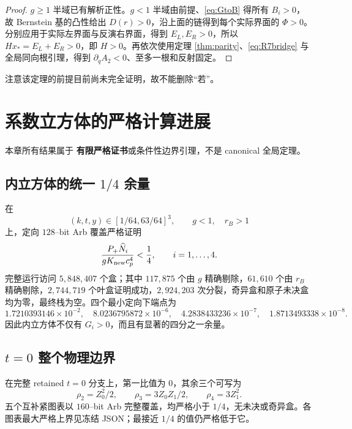 \documentclass[UTF8,12pt,openany,fontset=fandol]{ctexrep}
\theoremstyle{definition}
\newcommand{\Certified}{\textcolor{violet!70!black}{\textbf{有限严格证书}}}
\begin{document}
\begin{proof}
$g\ge1$ 半域已有解析正性。$g<1$ 半域由前提、\eqref{eq:GtoB} 得所有 $B_i>0$，故 Bernstein 基的凸性给出 $D(r)>0$，沿上面的链得到每个实际界面的 $\Phi>0$。分别应用于实际左界面与反演右界面，得到 $E_L,E_R>0$，所以 $Hx_*=E_L+E_R>0$，即 $H>0$。再依次使用定理 \ref{thm:parity}、\eqref{eq:R7bridge} 与全局同向根引理，得到 $\partial_qA_2<0$、至多一根和反射固定。
\end{proof}

注意该定理的前提目前尚未完全证明，故不能删除“若”。

\chapter{系数立方体的严格计算进展}

本章所有结果属于 \Certified 或条件性边界引理，不是 canonical 全局定理。

\section{内立方体的统一 $1/4$ 余量}

在
\begin{equation}
 (k,t,y)\in[1/64,63/64]^3,\qquad g<1,\quad r_B>1
\end{equation}
上，定向 $128$--bit Arb 覆盖严格证明
\begin{equation}\label{eq:quarter}
 \frac{P_+\widehat N_i}{gK_{\rm new}c_p^4}<\frac14,\qquad i=1,\ldots,4.
\end{equation}
完整运行访问 $5{,}848{,}407$ 个盒；其中 $117{,}875$ 个由 $g$ 精确剔除，$61{,}610$ 个由 $r_B$ 精确剔除，$2{,}744{,}719$ 个叶盒证明成功，$2{,}924{,}203$ 次分裂，奇异盒和原子未决盒均为零，最终栈为空。四个最小定向下端点为
\begin{equation}
 1.7210393146\times10^{-2},\quad
 8.0236795872\times10^{-6},\quad
 4.2838433236\times10^{-7},\quad
 1.8713493338\times10^{-8}.
\end{equation}
因此内立方体不仅有 $G_i>0$，而且有显著的四分之一余量。

\section{$t=0$ 整个物理边界}

在完整 retained $t=0$ 分支上，第一比值为 $0$，其余三个可写为
\begin{equation}
 \rho_2=Z_0^2/2,\qquad \rho_3=3Z_0Z_1/2,\qquad \rho_4=3Z_1^2.
\end{equation}
五个互补紧图表以 $160$--bit Arb 完整覆盖，均严格小于 $1/4$，无未决或奇异盒。各图表最大严格上界见冻结 JSON；最接近 $1/4$ 的值仍严格低于它。
\end{document}
